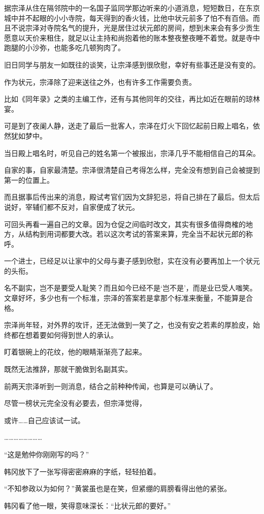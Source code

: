 据宗泽从住在隔邻院中的一名国子监同学那边听来的小道消息，短短数日，在东京城中并不起眼的小小寺院，每天得到的香火钱，比他中状元前多了怕不有百倍。而且不说宗泽对寺院名气的提升，光是居住过状元郎的房间，想到未来会有多少贡生愿意以天价来租住，就足以让主持和尚抱着他的账本整夜整夜睡不着觉。就是寺中跑腿的小沙弥，也能多吃几顿狗肉了。

旧日同学与朋友一如既往的谈笑，让宗泽感到很欣慰，幸好有些事还是没有变的。

作为状元，宗泽除了迎来送往之外，也有许多工作需要负责。

比如《同年录》之类的主编工作，还有与其他同年的交往，再比如近在眼前的琼林宴。

可是到了夜阑人静，送走了最后一批客人，宗泽在灯火下回忆起前日殿上唱名，依然犹如梦中。

当日殿上唱名时，听见自己的姓名第一个被报出，宗泽几乎不能相信自己的耳朵。

自家的事，自家最清楚。宗泽很清楚自己考得怎么样，完全没有想到自己会被提到第一的位置上。

而且据事后传出来的消息，殿试考官们因为文辞犯忌，将自己排在了最后。但太后说好，宰辅们都不反对，自家便成了状元。

可回头再看一遍自己的文章。因为仓促之间临时改文，其实有很多值得商榷的地方，从结构到用词都要大改。若以这次考试的答案来算，完全当不起状元郎的称呼。

一个进士，已经足以让家中的父母与妻子感到欣慰，实在没有必要再加上一个状元的头衔。

名不副实，岂不是要受人耻笑？而且如今已经不是‘岂不是’，而是业已受人嗤笑。文章好坏，多少也有一个标准，宗泽的答案若是拿那个标准来衡量，不能算是合格。

宗泽尚年轻，对外界的攻讦，还无法做到一笑了之，也没有安之若素的厚脸皮，始终都在想着要如何得到世人的承认。

盯着银碗上的花纹，他的眼睛渐渐亮了起来。

既然无法推辞，那就干脆做到名副其实。

前两天宗泽听到一则消息，结合之前种种传闻，也算是可以确认了。

尽管一榜状元完全没有必要去，但宗泽觉得，

或许……自己应该试一试。

……………………

“这是勉仲你刚刚写的吗？”

韩冈放下了一张写得密密麻麻的字纸，轻轻拍着。

“不知参政以为如何？”黄裳虽也是在笑，但紧绷的肩膀看得出他的紧张。

韩冈看了他一眼，笑得意味深长：“比状元郎的要好。”


